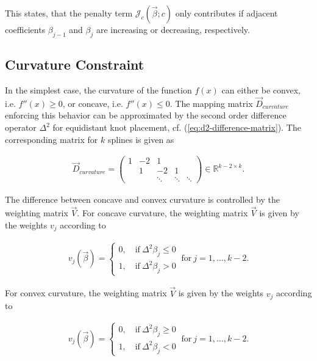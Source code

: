 \documentclass[10pt,a4paper]{report}
\begin{document}
This states, that the penalty term $\mathcal{J}_c(\vec{\beta}; c)$ only contributes if adjacent coefficients $\beta_{j-1}$ and $\beta_j$ are increasing or decreasing, respectively. \cite{hofner2011monotonicity} \cite{eilers2005unimodal}

\subsection{Curvature Constraint}

In the simplest case, the curvature of the function $f(x)$ can either be convex, i.e. $f''(x) \ge 0$, or concave, i.e. $f''(x) \le 0$. The mapping matrix $\vec{D}_{curvature}$ enforcing this behavior can be approximated by the second order difference operator $\Delta^2$ for equidistant knot placement, cf. (\ref{eq:d2-difference-matrix}). The corresponding matrix for $k$ splines is given as

\begin{align} \label{eq:D_c_curvature}
	\vec{D}_{curvature} = \begin{pmatrix} 1 & -2 & 1 		&  		 & \\ 
		& 1  &-2 	    &1 		 & \\
		& 	  & \ddots  & \ddots & \ddots  
	\end{pmatrix} \in \mathbb{R}^{k-2 \times k}.
\end{align}	

The difference between concave and convex curvature is controlled by the weighting matrix $\vec{V}$. For concave curvature, the weighting matrix $\vec{V}$ is given by the weights $v_j$ according to

\begin{align}\label{eq:v_curvature_concave}
	v_j(\vec{\beta}) = \begin{cases} 
		0, \quad \text{if} \ \Delta^2\beta_j \le 0 \\ 
		1, \quad \text{if} \ \Delta^2\beta_j > 0
	\end{cases} \ \text{for} \ j=1, \dots, k-2.
\end{align}

For convex curvature, the weighting matrix $\vec{V}$ is given by the weights $v_j$ according to

\begin{align}\label{eq:v_curvature_convex}
	v_j(\vec{\beta}) = \begin{cases} 
		0, \quad \text{if} \ \Delta^2\beta_j \ge 0 \\ 
		1, \quad \text{if} \ \Delta^2\beta_j < 0
	\end{cases}\ \text{for} \ j=1, \dots, k-2.
\end{align}	
\end{document}
